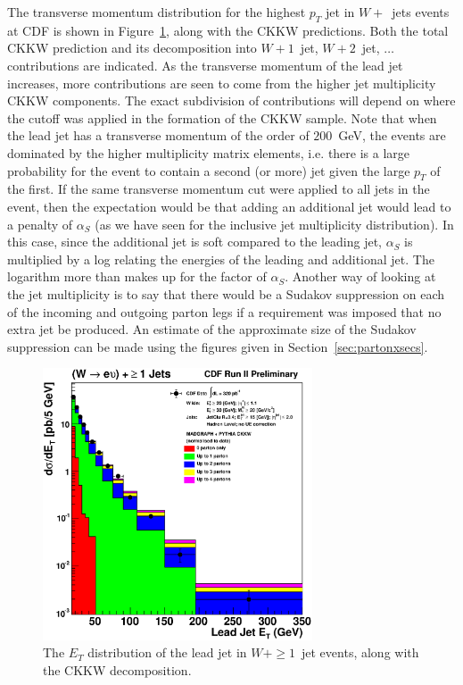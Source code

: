 \documentclass[12pt]{iopart}
\def\as{\alpha_S}
\begin{document}
The transverse momentum distribution for the highest $p_T$ jet in $W +$~jets events at CDF 
is shown in Figure~\ref{fig:W_1jet}, along with the CKKW predictions.
Both the total CKKW prediction and its decomposition into $W + 1$~jet, $W + 2$~jet, $\ldots$ contributions are indicated. As the
transverse momentum of the lead jet increases, more contributions are seen to come  from the higher jet multiplicity CKKW components.
The exact subdivision of contributions will  depend on where the cutoff was applied in the formation of the CKKW sample. Note  that
when the lead  jet has a transverse momentum of  the order of $200$~GeV, the events are  dominated by the higher multiplicity matrix
elements, i.e. there is a large probability for the event to contain a second (or more) jet given the large $p_T$ of the first.  
If the same transverse momentum cut were applied to all jets in the event, then the expectation would be that adding an additional jet
would lead to a penalty of $\as$ (as we have seen for the inclusive jet multiplicity distribution). In this case, since the additional
jet is soft compared to the leading jet, $\as$ is
multiplied by a log relating the energies of the leading and additional jet. The logarithm more than makes up for the factor of $\as$. 
Another way of looking at the jet multiplicity  is to say that there would be a Sudakov suppression on each of the incoming and
outgoing  parton legs  if a requirement was imposed that no extra jet be produced. An estimate of the approximate size of the Sudakov
suppression can be made using the figures given in Section~\ref{sec:partonxsecs}.
%
\begin{figure}[t]
\begin{center}
\includegraphics[width=8cm]{firstet_ckkw.eps}
\end{center}
\caption{
The $E_T$ distribution of the lead jet in $W + \ge 1$~jet events, along with the CKKW decomposition.
\label{fig:W_1jet}}
\end{figure}
%
\end{document}
